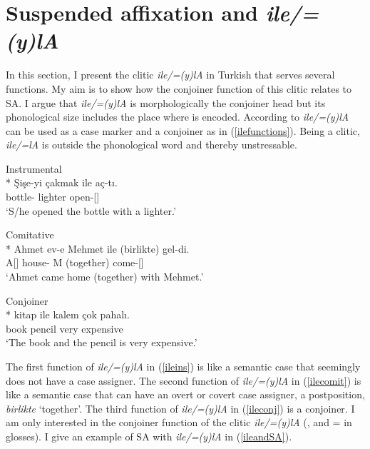 \section{Suspended affixation and \textit{ile/=(y)lA}} \label{sec:ile}

In this section, I present the clitic \textit{ile/=(y)lA} in Turkish that serves several functions. My aim is to show how the conjoiner function of this clitic relates to SA. I argue that \textit{ile/=(y)lA} is morphologically the conjoiner head but its phonological size includes the place where {\Case} is encoded. According to \citet{goksel2004turkish} \textit{ile/=(y)lA} can be used as a case marker and a conjoiner as in (\ref{ilefunctions}). Being a clitic, \textit{ile/=lA} is outside the phonological word and thereby unstressable.

\begin{exe}
    \ex \label{ilefunctions} 
    \begin{xlist}
    \ex Instrumental \label{ileins}\\*
    \gll Şişe-yi çakmak ile aç-tı.\\ 
    bottle-{\Acc} lighter {\Ins} open-{\Pst}[{\Tsg}] \\
    \glt `S/he opened the bottle with a lighter.'
    
    \ex Comitative \label{ilecomit}\\*
    \gll Ahmet ev-e Mehmet ile (birlikte) gel-di. \\
    A[{\Nom}] house-{\Dat} M {\Com} (together) come-{\Pst}[{\Tsg}] \\
    \glt `Ahmet came home (together) with Mehmet.'
    
    \ex Conjoiner \label{ileconj}\\*
    \gll kitap ile kalem çok pahalı. \\
    book {\And} pencil very expensive \\
    \glt `The book and the pencil is very expensive.'
    \end{xlist}
\end{exe}

The first function of \textit{ile/=(y)lA} in (\ref{ileins}) is like a semantic case \citet{woolford2006lexical} that seemingly does not have a case assigner. The second function of \textit{ile/=(y)lA} in (\ref{ilecomit}) is like a semantic case that can have an overt or covert case assigner, a postposition, \textit{birlikte} `together'. The third function of \textit{ile/=(y)lA} in (\ref{ileconj}) is a conjoiner. I am only interested in the conjoiner function of the clitic \textit{ile/=(y)lA} ({\And}, and ={\And} in glosses). I give an example of SA with \textit{ile/=(y)lA} in (\ref{ileandSA}).

